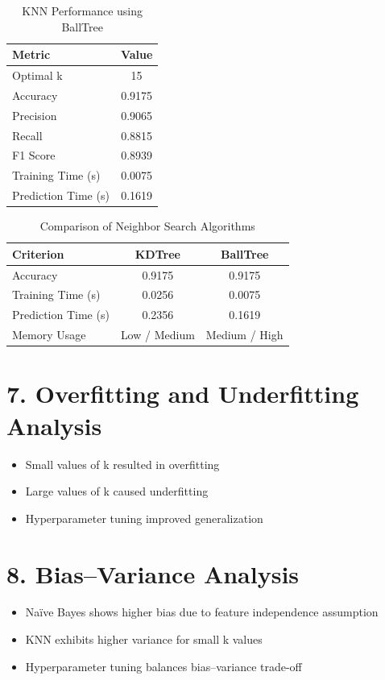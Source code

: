 \documentclass[11pt]{article}
\begin{document}
\begin{table}[H]
\centering
\caption{KNN Performance using BallTree}
\begin{tabular}{|l|c|}
\hline
\textbf{Metric} & \textbf{Value} \\ \hline
Optimal k & 15 \\ \hline
Accuracy & 0.9175 \\ \hline
Precision & 0.9065 \\ \hline
Recall & 0.8815 \\ \hline
F1 Score & 0.8939 \\ \hline
Training Time (s) & 0.0075 \\ \hline
Prediction Time (s) & 0.1619 \\ \hline
\end{tabular}
\end{table}

\begin{table}[H]
\centering
\caption{Comparison of Neighbor Search Algorithms}
\begin{tabular}{|l|c|c|}
\hline
\textbf{Criterion} & \textbf{KDTree} & \textbf{BallTree} \\ \hline
Accuracy & 0.9175 & 0.9175 \\ \hline
Training Time (s) & 0.0256 & 0.0075 \\ \hline
Prediction Time (s) & 0.2356 & 0.1619 \\ \hline
Memory Usage & Low / Medium & Medium / High \\ \hline
\end{tabular}
\end{table}


\section*{7. Overfitting and Underfitting Analysis}
\begin{itemize}
\item Small values of k resulted in overfitting
\item Large values of k caused underfitting
\item Hyperparameter tuning improved generalization
\end{itemize}


\section*{8. Bias–Variance Analysis}
\begin{itemize}
\item Naïve Bayes shows higher bias due to feature independence assumption
\item KNN exhibits higher variance for small k values
\item Hyperparameter tuning balances bias–variance trade-off
\end{itemize}
\end{document}
